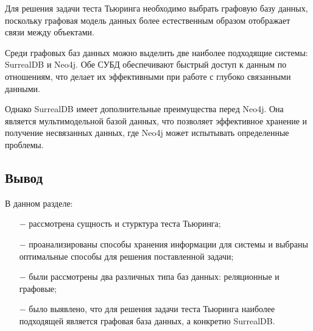 Для решения задачи теста Тьюринга необходимо выбрать графовую базу данных, поскольку графовая модель данных более естественным образом отображает связи между объектами. 

Среди графовых баз данных можно выделить две наиболее подходящие системы: SurrealDB и Neo4j. Обе СУБД обеспечивают быстрый доступ к данным по отношениям, что делает их эффективными при работе с глубоко связанными данными. 

Однако SurrealDB имеет дополнительные преимущества перед Neo4j. Она является мультимодельной базой данных, что позволяет эффективное хранение и получение несвязанных данных, где Neo4j может испытывать определенные проблемы.

\subsection*{Вывод}

В данном разделе:
\begin{itemize}
  \item[$-$] рассмотрена сущность и стурктура теста Тьюринга;
  \item[$-$] проанализированы способы хранения информации для системы и выбраны оптимальные способы для решения поставленной задачи;
  \item[$-$] были рассмотрены два различных типа баз данных: реляционные и графовые;
  \item[$-$] было выявлено, что для решения задачи теста Тьюринга наиболее подходящей является графовая база данных, а конкретно SurrealDB.
\end{itemize}








